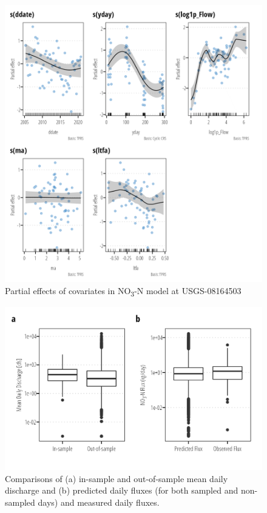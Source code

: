 \documentclass[
]{article}
\begin{document}
\begin{figure}[h]

{\centering \includegraphics{model_assessment_files/figure-pdf/unnamed-chunk-53-1.png}

}

\caption{Partial effects of covariates in NO\textsubscript{3}-N model at
USGS-08164503}

\end{figure}

\begin{figure}[h]

{\centering \includegraphics{model_assessment_files/figure-pdf/unnamed-chunk-54-1.png}

}

\caption{Comparisons of (a) in-sample and out-of-sample mean daily
discharge and (b) predicted daily fluxes (for both sampled and
non-sampled days) and measured daily fluxes.}

\end{figure}
\end{document}
